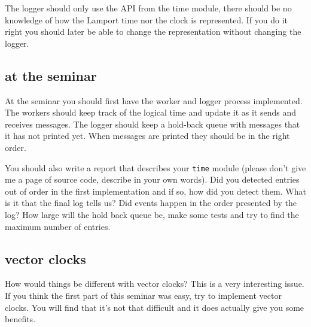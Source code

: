 \documentclass[a4paper, 11pt]{article}
\begin{document}
The logger should only use the API from the time module, there should
be no knowledge of how the Lamport time nor the clock is
represented. If you do it right you should later be able to change the
representation without changing the logger.


\subsection{at the seminar}

At the seminar you should first have the worker and logger
process implemented. The workers should keep track of the logical time
and update it as it sends and receives messages. The logger should
keep a hold-back queue with messages that it has not printed yet. When
messages are printed they should be in the right order.

You should also write a report that describes your {\tt time} module
(please don't give me a page of source code, describe in your own
words).  Did you detected entries out of order in the first
implementation and if so, how did you detect them. What is it that the
final log tells us? Did events happen in the order presented by the
log? How large will the hold back queue be, make some tests and try to
find the maximum number of entries.

\subsection{vector clocks}

How would things be different with vector clocks? This is a
very interesting issue. If you think the first part of this seminar was
easy, try to implement vector clocks. You will find that it's not that
difficult and it does actually give you some benefits.
\end{document}
